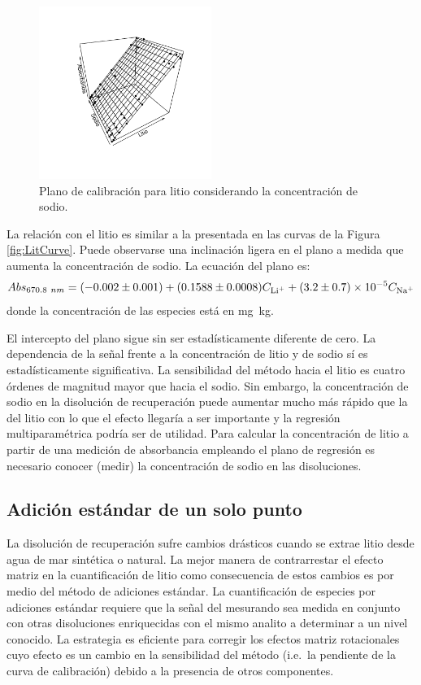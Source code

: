\begin{figure}[H]
    \centering
    \includegraphics[width=0.5\textwidth, trim={3cm 2.5cm 2.05cm 2.3cm}, clip]{App/images/LiPlane.pdf}
    \caption{Plano de calibración para litio considerando la concentración de sodio.}
    \label{fig:planarLit}
\end{figure}
\clearpage La relación con el litio es similar a la presentada en las curvas de la Figura \ref{fig:LitCurve}. Puede observarse una inclinación ligera en el plano a medida que aumenta la concentración de sodio. La ecuación del plano es:
\begin{equation}\label{eq:litPlan}
    Abs_{670.8~nm}=(-0.002\pm0.001)+(0.1588\pm0.0008) C_{\ce{Li^+}}+(3.2\pm0.7)\e{-5} C_{\ce{Na^+}}
\end{equation}
donde la concentración de las especies está en mg~kg\mnn. 

El intercepto del plano sigue sin ser estadísticamente diferente de cero. La dependencia de la señal frente a la concentración de litio y de sodio sí es estadísticamente significativa. La sensibilidad del método hacia el litio es cuatro órdenes de magnitud mayor que hacia el sodio. Sin embargo, la concentración de sodio en la disolución de recuperación puede aumentar mucho más rápido que la del litio con lo que el efecto llegaría a ser importante y la regresión multiparamétrica podría ser de utilidad. Para calcular la concentración de litio a partir de una medición de absorbancia empleando el plano de regresión es necesario conocer (medir) la concentración de sodio en las disoluciones. 

\subsection{Adición estándar de un solo punto}
La disolución de recuperación sufre cambios drásticos cuando se extrae litio desde agua de mar sintética o natural. La mejor manera de contrarrestar el efecto matriz en la cuantificación de litio como consecuencia de estos cambios es por medio del método de adiciones estándar. La cuantificación de especies por adiciones estándar requiere que la señal del mesurando sea medida en conjunto con otras disoluciones enriquecidas con el mismo analito a determinar a un nivel conocido. La estrategia es eficiente para corregir los efectos matriz rotacionales cuyo efecto es un cambio en la sensibilidad del método (i.e.\ la pendiente de la curva de calibración) debido a la presencia de otros componentes.


